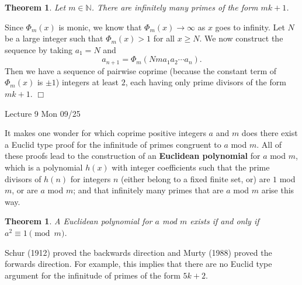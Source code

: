 \documentclass{article}
\def\N{{\mathbb N}}
\newtheorem{theorem}[subsection]{Theorem}
\newenvironment{proof}{\noindent {\bf Proof:}}{$\Box$ \vspace{2 ex}}
\newcommand{\add}[1]{{\color{blue} #1}}
\begin{document}
\begin{theorem}
    Let $m\in\N$. There are infinitely many primes of the form $mk + 1$.
\end{theorem}

\begin{proof}
    Since $\Phi_m(x)$ is monic, we know that $\Phi_m(x)\rightarrow\infty$ as $x$ goes to infinity. Let $N$ be a large integer such that $\Phi_m(x) > 1$ for all $x\geq N$. We now construct the sequence by taking $a_1 = N$ and
    $$a_{n+1} = \Phi_m(Nma_1a_2\cdots a_n).$$
    Then we have a sequence of pairwise coprime (because the constant term of $\Phi_m(x)$ is $\pm1$) integers at least $2$, each having only prime divisors of the form $mk+1$.
\end{proof}

\begin{center}
    \add{Lecture 9 Mon 09/25}
\end{center}

It makes one wonder for which coprime positive integers $a$ and $m$ does there exist a Euclid type proof for the infinitude of primes congruent to $a$ mod $m$. All of these proofs lead to the construction of an \textbf{Euclidean polynomial} for $a$ mod $m$, which is a polynomial $h(x)$ with integer coefficients such that the prime divisors of $h(n)$ for integers $n$ (either belong to a fixed finite set, or) are $1$ mod $m$, or are $a$ mod $m$; and that infinitely many primes that are $a$ mod $m$ arise this way.

\begin{theorem}
    A Euclidean polynomial for $a$ mod $m$ exists if and only if $a^2\equiv 1\pmod{m}$.
\end{theorem}

Schur (1912) proved the backwards direction and Murty (1988) proved the forwards direction. For example, this implies that there are no Euclid type argument for the infinitude of primes of the form $5k+2$. 
\end{document}

